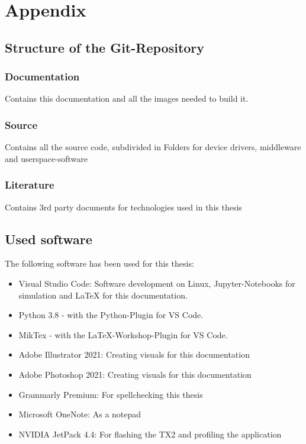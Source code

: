 \chapter{Appendix}
\label{sec:Anhang}

\section{Structure of the Git-Repository}
\label{sec:Anhang_struktur}
\subsection{Documentation}
Contains this documentation and all the images needed to build it.
\subsection{Source}
Contains all the source code, subdivided in Folders for device drivers, middleware and userspace-software
\subsection{Literature}
Contains 3rd party documents for technologies used in this thesis

\section{Used software}
\label{sec:usedSoftware}
The following software has been used for this thesis:
\begin{itemize} %
	\item Visual Studio Code: Software development on Linux, Jupyter-Notebooks for simulation and LaTeX for this documentation.
	\item Python 3.8 - with the Python-Plugin for VS Code.
	\item MikTex - with the LaTeX-Workshop-Plugin for VS Code.
	\item Adobe Illustrator 2021: Creating visuals for this documentation
	\item Adobe Photoshop 2021: Creating visuals for this documentation
	\item Grammarly Premium: For spellchecking this thesis
	\item Microsoft OneNote: As a notepad
	\item NVIDIA JetPack 4.4: For flashing the TX2 and profiling the application
\end{itemize}